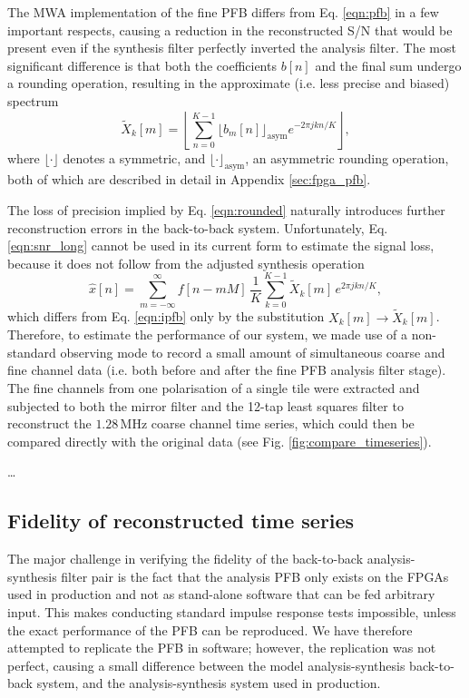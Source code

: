 \documentclass{pasa}%
\begin{document}
The MWA implementation of the fine PFB differs from Eq. \eqref{eqn:pfb} in a few important respects, causing a reduction in the reconstructed S/N that would be present even if the synthesis filter perfectly inverted the analysis filter.
The most significant difference is that both the coefficients $b[n]$ and the final sum undergo a rounding operation, resulting in the approximate (i.e. less precise and biased) spectrum
\begin{equation}
    \tilde{X}_k[m] = \left\lfloor\sum_{n=0}^{K-1} \bigg\lfloor b_m[n] \bigg\rfloor_{\text{asym}} e^{-2\pi jkn/K}\right\rfloor,
    \label{eqn:rounded}
\end{equation}
where $\lfloor\cdot\rfloor$ denotes a symmetric, and $\lfloor\cdot\rfloor_{\text{asym}}$, an asymmetric rounding operation, both of which are described in detail in Appendix \ref{sec:fpga_pfb}.

The loss of precision implied by Eq. \eqref{eqn:rounded} naturally introduces further reconstruction errors in the back-to-back system.
Unfortunately, Eq. \eqref{eqn:snr_long} cannot be used in its current form to estimate the signal loss, because it does not follow from the adjusted synthesis operation
\begin{equation}
    \hat{x}[n] = \sum_{m = -\infty}^{\infty} f[n - mM]\,
        \frac{1}{K} \sum_{k=0}^{K-1} \tilde{X}_k[m]\,e^{2\pi jkn/K},
    \label{eqn:ipfb_adjusted}
\end{equation}
which differs from Eq. \eqref{eqn:ipfb} only by the substitution $X_k[m] \rightarrow \tilde{X}_k[m]$.
Therefore, to estimate the performance of our system, we made use of a non-standard observing mode to record a small amount of simultaneous coarse and fine channel data (i.e. both before and after the fine PFB analysis filter stage).
The fine channels from one polarisation of a single tile were extracted and subjected to both the mirror filter and the 12-tap least squares filter to reconstruct the $1.28\,$MHz coarse channel time series, which could then be compared directly with the original data (see Fig. \ref{fig:compare_timeseries}).

\dots

\subsection{Fidelity of reconstructed time series}
\label{sec:fidelity}

The major challenge in verifying the fidelity of the back-to-back analysis-synthesis filter pair is the fact that the analysis PFB only exists on the FPGAs used in production and not as stand-alone software that can be fed arbitrary input.
This makes conducting standard impulse response tests impossible, unless the exact performance of the PFB can be reproduced.
We have therefore attempted to replicate the PFB in software; however, the replication was not perfect, causing a small difference between the model analysis-synthesis back-to-back system, and the analysis-synthesis system used in production.
\end{document}
